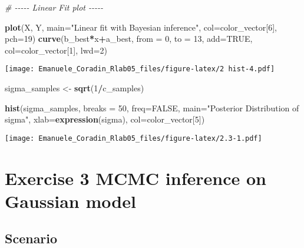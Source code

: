 \documentclass[
]{article}
\newenvironment{Shaded}{\begin{snugshade}}{\end{snugshade}}
\newcommand{\AttributeTok}[1]{\textcolor[rgb]{0.13,0.29,0.53}{#1}}
\newcommand{\CommentTok}[1]{\textcolor[rgb]{0.56,0.35,0.01}{\textit{#1}}}
\newcommand{\ConstantTok}[1]{\textcolor[rgb]{0.56,0.35,0.01}{#1}}
\newcommand{\DecValTok}[1]{\textcolor[rgb]{0.00,0.00,0.81}{#1}}
\newcommand{\FunctionTok}[1]{\textcolor[rgb]{0.13,0.29,0.53}{\textbf{#1}}}
\newcommand{\NormalTok}[1]{#1}
\newcommand{\OtherTok}[1]{\textcolor[rgb]{0.56,0.35,0.01}{#1}}
\newcommand{\SpecialCharTok}[1]{\textcolor[rgb]{0.81,0.36,0.00}{\textbf{#1}}}
\newcommand{\StringTok}[1]{\textcolor[rgb]{0.31,0.60,0.02}{#1}}
\begin{document}
\begin{Shaded}
\begin{Highlighting}[]
\CommentTok{\# {-}{-}{-}{-}{-} Linear Fit plot {-}{-}{-}{-}{-}}

\FunctionTok{plot}\NormalTok{(X, Y, }\AttributeTok{main=}\StringTok{"Linear fit with Bayesian inference"}\NormalTok{, }\AttributeTok{col=}\NormalTok{color\_vector[}\DecValTok{6}\NormalTok{], }\AttributeTok{pch=}\DecValTok{19}\NormalTok{)}
\FunctionTok{curve}\NormalTok{(b\_best}\SpecialCharTok{*}\NormalTok{x}\SpecialCharTok{+}\NormalTok{a\_best, }\AttributeTok{from =} \DecValTok{0}\NormalTok{, }\AttributeTok{to =} \DecValTok{13}\NormalTok{, }\AttributeTok{add=}\ConstantTok{TRUE}\NormalTok{, }\AttributeTok{col=}\NormalTok{color\_vector[}\DecValTok{1}\NormalTok{], }\AttributeTok{lwd=}\DecValTok{2}\NormalTok{)}
\end{Highlighting}
\end{Shaded}

\texttt{[image: Emanuele\_Coradin\_Rlab05\_files/figure-latex/2 hist-4.pdf]}

\begin{Shaded}
\begin{Highlighting}[]
\NormalTok{sigma\_samples }\OtherTok{\textless{}{-}} \FunctionTok{sqrt}\NormalTok{(}\DecValTok{1}\SpecialCharTok{/}\NormalTok{c\_samples)}

\FunctionTok{hist}\NormalTok{(sigma\_samples, }\AttributeTok{breaks =} \DecValTok{50}\NormalTok{, }\AttributeTok{freq=}\ConstantTok{FALSE}\NormalTok{, }\AttributeTok{main=}\StringTok{"Posterior Distribution of sigma"}\NormalTok{, }\AttributeTok{xlab=}\FunctionTok{expression}\NormalTok{(sigma), }\AttributeTok{col=}\NormalTok{color\_vector[}\DecValTok{5}\NormalTok{])}
\end{Highlighting}
\end{Shaded}

\texttt{[image: Emanuele\_Coradin\_Rlab05\_files/figure-latex/2.3-1.pdf]}

\hypertarget{exercise-3-mcmc-inference-on-gaussian-model}{%
\section{Exercise 3 MCMC inference on Gaussian
model}\label{exercise-3-mcmc-inference-on-gaussian-model}}

\hypertarget{scenario-2}{%
\subsection{Scenario}\label{scenario-2}}
\end{document}
